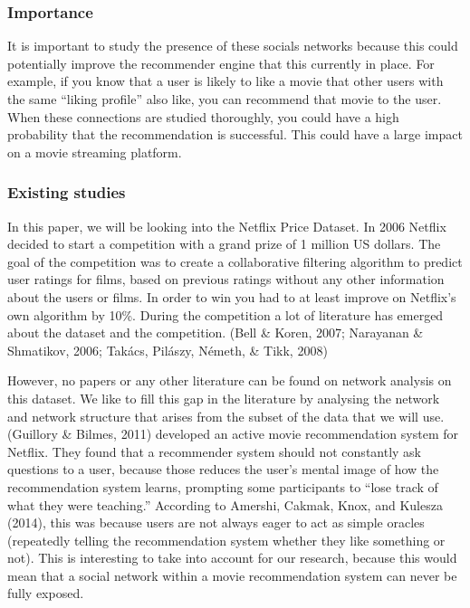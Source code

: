 \documentclass[
  english,
  man,floatsintext]{apa6}
\begin{document}
\hypertarget{importance}{%
\subsubsection{Importance}\label{importance}}

It is important to study the presence of these socials networks because this could potentially improve the recommender engine that this currently in place. For example, if you know that a user is likely to like a movie that other users with the same ``liking profile'' also like, you can recommend that movie to the user. When these connections are studied thoroughly, you could have a high probability that the recommendation is successful. This could have a large impact on a movie streaming platform.

\hypertarget{existing-studies}{%
\subsubsection{Existing studies}\label{existing-studies}}

In this paper, we will be looking into the Netflix Price Dataset. In 2006 Netflix decided to start a competition with a grand prize of 1 million US dollars. The goal of the competition was to create a collaborative filtering algorithm to predict user ratings for films, based on previous ratings without any other information about the users or films. In order to win you had to at least improve on Netflix's own algorithm by 10\%.
During the competition a lot of literature has emerged about the dataset and the competition. (Bell \& Koren, 2007; Narayanan \& Shmatikov, 2006; Takács, Pilászy, Németh, \& Tikk, 2008)

However, no papers or any other literature can be found on network analysis on this dataset. We like to fill this gap in the literature by analysing the network and network structure that arises from the subset of the data that we will use.
(Guillory \& Bilmes, 2011) developed an active movie recommendation system for Netflix. They found that a recommender system should not constantly ask questions to a user, because those reduces the user's mental image of how the recommendation system learns, prompting some participants to ``lose track of what they were teaching.'' According to Amershi, Cakmak, Knox, and Kulesza (2014), this was because users are not always eager to act as simple oracles (repeatedly telling the recommendation system whether they like something or not). This is interesting to take into account for our research, because this would mean that a social network within a movie recommendation system can never be fully exposed.
\end{document}
